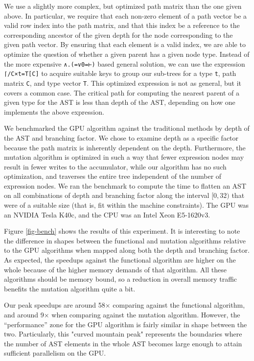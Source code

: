 ﻿\documentclass[numbers,10pt,preprint]{sigplanconf}
\begin{document}
We use a slightly more complex, but optimized path matrix than the one given above. In particular, we require that each non-zero element of a path vector be a valid row index into the path matrix, and that this index be a reference to the corresponding ancestor of the given depth for the node corresponding to the given path vector. By ensuring that each element is a valid index, we are able to optimize the question of whether a given parent has a given node type. Instead of the more expensive  \verb;∧.(=∨0=⊢); based general solution, we can use the expression \verb;⌈/C×t=T[C]; to acquire suitable keys to group our sub-trees for a type \verb;t;, path matrix \verb;C;, and type vector \verb;T;. This optimized expression is not as general, but it covers a common case. The critical path for computing the nearest parent of a given type for the AST is less than depth of the AST, depending on how one implements the above expression.

We benchmarked the GPU algorithm against the traditional methods by depth of the AST and branching factor. We chose to examine depth as a specific factor because the path matrix is inherently dependent on the depth. Furthermore, the mutation algorithm is optimized in such a way that fewer expression nodes may result in fewer writes to the accumulator, while our algorithm has no such optimization, and traverses the entire tree independent of the number of expression nodes. We ran the benchmark to compute the time to flatten an AST on all combinations of depth and branching factor along the interval $[0,32)$ that were of a suitable size (that is, fit within the machine constraints). The GPU was an NVIDIA Tesla K40c, and the CPU was an Intel Xeon  E5-1620v3. 

Figure \ref{fig-bench} shows the results of this experiment. It is interesting to note the difference in shapes between the functional and mutation algorithms relative to the GPU algorithms when mapped along both the depth and branching factor. As expected, the speedups against the functional algorithm are higher on the whole because of the higher memory demands of that algorithm. All these algorithms should be memory bound, so a reduction in overall memory traffic benefits the mutation algorithm quite a bit. 

Our peak speedups are around 58× comparing against the functional algorithm, and around 9× when comparing against the mutation algorithm. However, the ``performance'' zone for the GPU algorithm is fairly similar in shape between the two. Particularly, this "curved mountain peak" represents the boundaries where the number of AST elements in the whole AST becomes large enough to attain sufficient parallelism on the GPU. 
\end{document}

